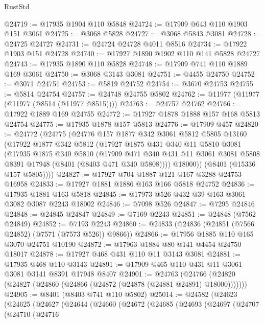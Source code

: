 \begin{lexlean}{RustStd}
\begin{coremodule}
@24719 := @17935 @1904 @110 @5848
@24724 := @17909 @643 @110 @1903 @151 @3061
@24725 := @3068 @5828
@24727 := @3068 @5843 @3081
@24728 := @24725 @24727
@24731 := @24724 @24728 @4011 @8516
@24734 := @17922 @1903 @151 @24728
@24740 := @17927 @1890 @1902 @110 @141 @5828 @24727
@24743 := @17935 @1890 @110 @5828
@24748 := @17909 @741 @110 @1889 @169 @3061
@24750 := @3068 @3143 @3081
@24751 := @4455 @24750
@24752 := @3071 @24751
@24753 := @5819 @24752
@24754 := @3670 @24753
@24755 := @5814 @24754
@24757 := @24748 @24755 @5802
@24762 := @11977 (@11977 (@11977 (@8514 (@11977 @8515))))
@24763 := @24757 @24762
@24766 := @17922 @1889 @169 @24755
@24772 := @17927 @1878 @1888 @157 @168 @5813 @24754
@24775 := @17935 @1878 @157 @5813
@24776 := @17909 @457
@24820 := @24772
    (@24775
      (@24776
        @157
        @1877
        @342
        @3061
        @5812
        @5805
        @13160
        (@17922
          @1877
          @342
          @5812
          (@17927
            @1875
            @431
            @340
            @11
            @5810
            @3081
            (@17935
              @1875
              @340
              @5810
              (@17909
                @471
                @340
                @431
                @11
                @3061
                @3081
                @5808
                @8391
                @17948
                (@8401 (@8403 @471 @340 @5808))))
            @18000))
        (@8401 (@15336 @157 @5805))))
@24827 := @17927 @704 @1887 @121 @167 @3288 @24753 @16958
@24833 := @17927 @1881 @1886 @163 @166 @5818 @24752
@24836 := @17935 @1881 @163 @5818
@24845 := @17973 @526 @432 @39 @163 @3061 @3082 @3087 @2243 @18002
@24846 := @7098 @526
@24847 := @7295 @24846
@24848 := @24845 @24847
@24849 := @7169 @2243
@24851 := @24848 (@7562 @24849)
@24852 := @7193 @2243
@24860 := @24833 (@24836 (@24851 (@7566 @24852) (@7571 (@7573 @526)) @9866))
@24866 := @17956 @1885 @110 @165 @3070 @24751 @10190
@24872 := @17963 @1884 @80 @141 @4454 @24750 @18017
@24878 := @17927 @468 @431 @110 @11 @3143 @3081
@24881 := @17935 @468 @110 @3143
@24891 := @17909 @465 @110 @431 @11 @3061 @3081 @3141 @8391 @17948 @8407
@24901 := @24763
    (@24766 (@24820 (@24827 (@24860 (@24866 (@24872 (@24878 (@24881 @24891) @18000)))))))
@24905 := @8401 (@8403 @741 @110 @5802)
@25014 := @24582
    (@24623
      (@24625
        (@24627
          (@24644
            (@24660
              (@24672
                (@24685
                  (@24693
                    (@24697
                      (@24707
                        (@24710
                          (@24716

\end{coremodule}
\end{lexlean}
